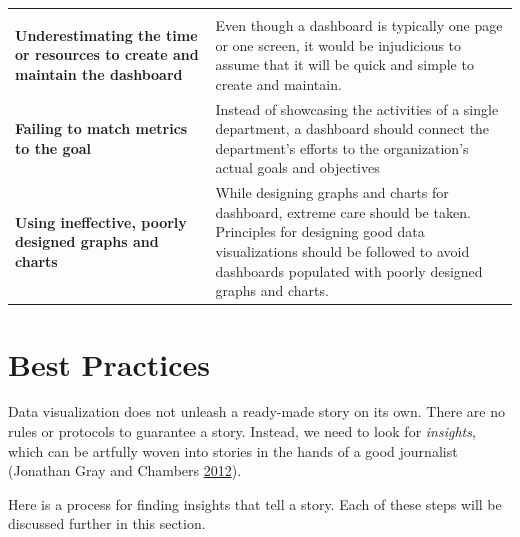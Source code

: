 \documentclass[]{book}
\begin{document}
\begin{longtable}[]{@{}ll@{}}
\begin{minipage}[t]{0.66\columnwidth}
\end{minipage}\tabularnewline
\begin{minipage}[t]{0.28\columnwidth}\raggedright
\textbf{Underestimating the time or resources to create and maintain the dashboard}\strut
\end{minipage} & \begin{minipage}[t]{0.66\columnwidth}\raggedright
Even though a dashboard is typically one page or one screen, it would be injudicious to assume that it will be quick and simple to create and maintain.\strut
\end{minipage}\tabularnewline
\begin{minipage}[t]{0.28\columnwidth}\raggedright
\textbf{Failing to match metrics to the goal}\strut
\end{minipage} & \begin{minipage}[t]{0.66\columnwidth}\raggedright
Instead of showcasing the activities of a single department, a dashboard should connect the department's efforts to the organization's actual goals and objectives\strut
\end{minipage}\tabularnewline
\begin{minipage}[t]{0.28\columnwidth}\raggedright
\textbf{Using ineffective, poorly designed graphs and charts}\strut
\end{minipage} & \begin{minipage}[t]{0.66\columnwidth}\raggedright
While designing graphs and charts for dashboard, extreme care should be taken. Principles for designing good data visualizations should be followed to avoid dashboards populated with poorly designed graphs and charts.\strut
\end{minipage}\tabularnewline
\bottomrule
\end{longtable}

\hypertarget{best-practices}{%
\section{Best Practices}\label{best-practices}}

Data visualization does not unleash a ready-made story on its own. There are no rules or protocols to guarantee a story. Instead, we need to look for \emph{insights}, which can be artfully woven into stories in the hands of a good journalist (Jonathan Gray and Chambers \protect\hyperlink{ref-The-Data-Journalism-Handbook}{2012}).

Here is a process for finding insights that tell a story. Each of these steps will be discussed further in this section.
\end{document}
